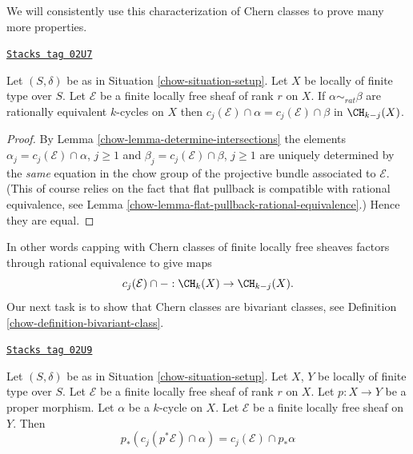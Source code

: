 We will consistently use this characterization of Chern classes
to prove many more properties.

\begin{lemma}
\label{chow-lemma-cap-chern-class-factors-rational-equivalence}
\href{https://stacks.math.columbia.edu/tag/02U7}{\texttt{Stacks tag 02U7}}

Let $(S, \delta)$ be as in Situation \ref{chow-situation-setup}.
Let $X$ be locally of finite type over $S$.
Let $\mathcal{E}$ be a finite locally free sheaf of rank $r$ on $X$.
If $\alpha \sim_{rat} \beta$ are rationally equivalent $k$-cycles
on $X$ then $c_j(\mathcal{E}) \cap \alpha = c_j(\mathcal{E}) \cap \beta$
in $\CH_{k - j}(X)$.
\end{lemma}

\begin{proof}

By Lemma \ref{chow-lemma-determine-intersections} the elements
$\alpha_j = c_j(\mathcal{E}) \cap \alpha$, $j \geq 1$ and
$\beta_j = c_j(\mathcal{E}) \cap \beta$, $j \geq 1$ are uniquely determined
by the {\it same} equation in the chow group of the projective
bundle associated to $\mathcal{E}$. (This of course relies on the fact that
flat pullback is compatible with rational equivalence, see
Lemma \ref{chow-lemma-flat-pullback-rational-equivalence}.) Hence they are equal.
\end{proof}

In other words capping with Chern classes of
finite locally free sheaves factors through rational equivalence
to give maps
$$
c_j(\mathcal{E}) \cap - : \CH_k(X) \to \CH_{k - j}(X).
$$
Our next task is to show that Chern classes are bivariant classes, see
Definition \ref{chow-definition-bivariant-class}.

\begin{lemma}
\label{chow-lemma-pushforward-cap-cj}
\href{https://stacks.math.columbia.edu/tag/02U9}{\texttt{Stacks tag 02U9}}

Let $(S, \delta)$ be as in Situation \ref{chow-situation-setup}.
Let $X$, $Y$ be locally of finite type over $S$.
Let $\mathcal{E}$ be a finite locally free sheaf of rank $r$ on $X$.
Let $p : X \to Y$ be a proper morphism.
Let $\alpha$ be a $k$-cycle on $X$.
Let $\mathcal{E}$ be a finite locally free sheaf on $Y$.
Then
$$
p_*(c_j(p^*\mathcal{E}) \cap \alpha) = c_j(\mathcal{E}) \cap p_*\alpha
$$
\end{lemma}

